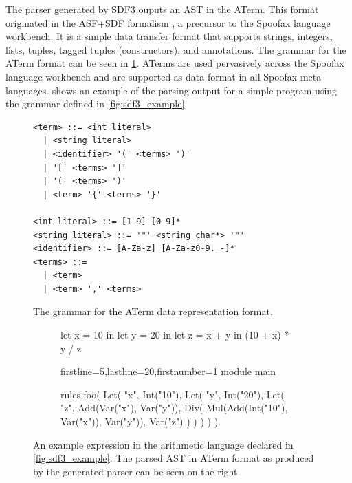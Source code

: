 The parser generated by SDF3 ouputs an \ac{AST} in the \acf{ATerm}. This format originated in the ASF+SDF formalism \cite{DHP:1996}, a precursor to the Spoofax language workbench. It is a simple data transfer format that supports strings, integers, lists, tuples, tagged tuples (constructors), and annotations. The grammar for the ATerm format can be seen in \cref{fig:aterm_grammar}. \acp{ATerm} are used pervasively across the Spoofax language workbench and are supported as data format in all Spoofax meta-languages.  shows an example of the parsing output for a simple program using the grammar defined in \cref{fig:sdf3_example}.\\


\begin{figure}
  \begin{lstlisting}
<term> ::= <int literal>
  | <string literal>
  | <identifier> '(' <terms> ')'
  | '[' <terms> ']'
  | '(' <terms> ')'
  | <term> '{' <terms> '}'

<int literal> ::= [1-9] [0-9]*
<string literal> ::= '"' <string char*> '"'
<identifier> ::= [A-Za-z] [A-Za-z0-9._-]*
<terms> ::=
  | <term>
  | <term> ',' <terms>
  \end{lstlisting}
  \caption{The grammar for the \ac{ATerm} data representation format.}
  \label{fig:aterm_grammar}
\end{figure}

\begin{figure}
  \centering
  \begin{subfigure}{.35\textwidth}
    \centering
    \begin{mat}
let x = 10 in
  let y = 20 in
    let z = x + y in
      (10 + x) * y / z
    \end{mat}
  \end{subfigure}\hfill%
  \begin{subfigure}{.585\textwidth}
    \centering
    \begin{statix*}{firstline=5,lastline=20,firstnumber=1}
module main

rules
  foo(
Let(
  "x",
  Int("10"),
  Let(
    "y",
    Int("20"),
    Let(
      "z",
      Add(Var("x"), Var("y")),
      Div(
        Mul(Add(Int("10"), Var("x")), Var("y")),
        Var("z")
      )
    )
  )
)
  ).
    \end{statix*}
  \end{subfigure}
  \caption{An example expression in the arithmetic language declared in \cref{fig:sdf3_example}\protect\footnotemark. The parsed \ac{AST} in \ac{ATerm} format as produced by the generated parser can be seen on the right.}
  \label{fig:sdf3_example_parse_output}
\end{figure}

